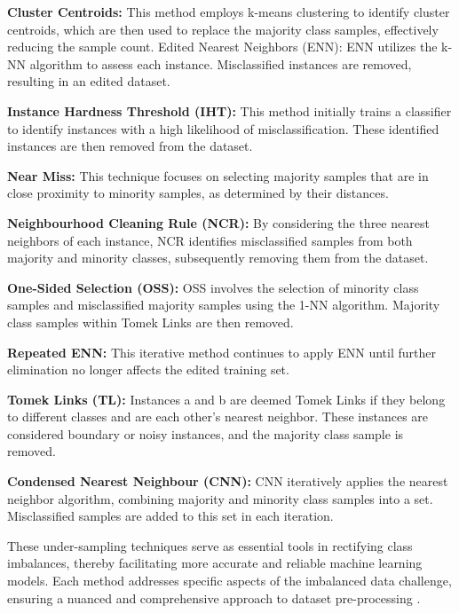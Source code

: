 \textbf{Cluster Centroids:} This method employs k-means clustering to identify cluster centroids, which are then used to replace the majority class samples, effectively reducing the sample count. Edited Nearest Neighbors (ENN): ENN utilizes the k-NN algorithm to assess each instance. Misclassified instances are removed, resulting in an edited dataset. 

\textbf{Instance Hardness Threshold (IHT): }This method initially trains a classifier to identify instances with a high likelihood of misclassification. These identified instances are then removed from the dataset. 

\textbf{Near Miss:} This technique focuses on selecting majority samples that are in close proximity to minority samples, as determined by their distances. 

\textbf{Neighbourhood Cleaning Rule (NCR):} By considering the three nearest neighbors of each instance, NCR identifies misclassified samples from both majority and minority classes, subsequently removing them from the dataset. 

\textbf{One-Sided Selection (OSS):} OSS involves the selection of minority class samples and misclassified majority samples using the 1-NN algorithm. Majority class samples within Tomek Links are then removed. 

\textbf{Repeated ENN:} This iterative method continues to apply ENN until further elimination no longer affects the edited training set. 

\textbf{Tomek Links (TL):} Instances a and b are deemed Tomek Links if they belong to different classes and are each other's nearest neighbor. These instances are considered boundary or noisy instances, and the majority class sample is removed. 

\textbf{Condensed Nearest Neighbour (CNN):} CNN iteratively applies the nearest neighbor algorithm, combining majority and minority class samples into a set. Misclassified samples are added to this set in each iteration. 

These under-sampling techniques serve as essential tools in rectifying class imbalances, thereby facilitating more accurate and reliable machine learning models. Each method addresses specific aspects of the imbalanced data challenge, ensuring a nuanced and comprehensive approach to dataset pre-processing \cite{Fotouhi2019,Khushi2021}.

